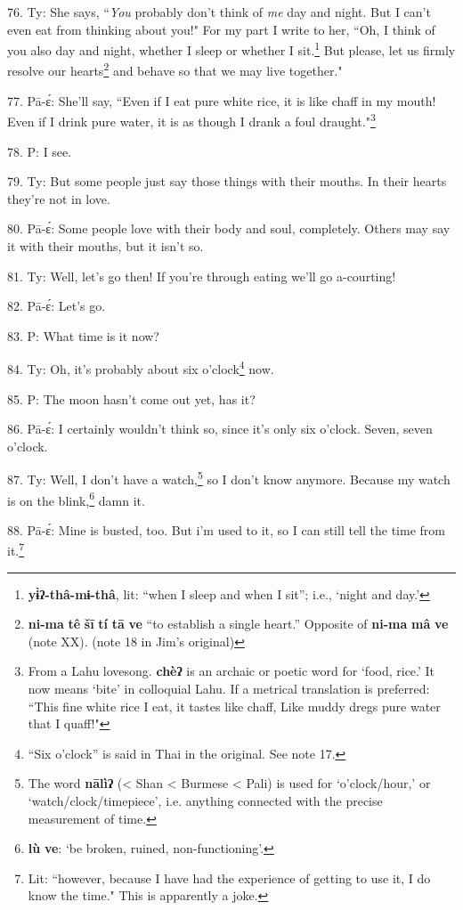 76. Ty: She says, ``\textit{You} probably don't think of \textit{me}
day and night. But I can't even eat from thinking about you!" For my part
I write to her, ``Oh, I think of you also day and night, whether I sleep
or whether I sit.\footnote{\textbf{yɨ̀ʔ-thâ-mɨ-thâ}, lit: ``when I sleep and when I sit''; i.e., `night and day.'} But please, let us firmly resolve our hearts\footnote{\textbf{ni-ma} \textbf{tê} \textbf{šī} \textbf{tí} \textbf{tā} \textbf{ve} ``to establish a single heart.'' Opposite of \textbf{ni-ma} \textbf{mâ} \textbf{ve} (note XX). (note 18 in Jim's original)} and behave
so that we may live together."

77. Pā-ɛ́: She'll say, ``Even if I eat pure white rice, it is like chaff
in my mouth! Even if I drink pure water, it is as though I drank a foul draught."\footnote{From a Lahu lovesong. \textbf{chèʔ} is an archaic or poetic word for `food, rice.' It now means `bite' in colloquial Lahu. If a metrical translation is preferred: ``This fine white rice I eat, it tastes like chaff, Like muddy dregs pure water that I quaff!"}

78. P: I see.

79. Ty: But some people just say those things with their mouths. In their
hearts they're not in love.

80. Pā-ɛ́: Some people love with their body and soul, completely. Others may
say it with their mouths, but it isn't so.

81. Ty: Well, let's go then! If you're through eating we'll go a-courting!

82. Pā-ɛ́: Let's go.

83. P: What time is it now?

84. Ty: Oh, it's probably about six o'clock\footnote{``Six o'clock'' is said in Thai in the original. See note 17.} now.

85. P: The moon hasn't come out yet, has it?

86. Pā-ɛ́: I certainly wouldn't think so, since it's only six o'clock. Seven,
seven o'clock.

87. Ty: Well, I don't have a watch,\footnote{The word \textbf{nālìʔ} (< Shan < Burmese < Pali) is used for `o'clock/hour,' or `watch/clock/timepiece', i.e. anything connected with the precise measurement of time.} so I don't know anymore. Because my
watch is on the blink,\footnote{\textbf{lù} \textbf{ve}: `be broken, ruined, non-functioning'.} damn it.

88. Pā-ɛ́: Mine is busted, too. But i'm used to it, so I can still tell the
time from it.\footnote{Lit: ``however, because I have had the experience of getting to use it, I do know the time." This is apparently a joke.}

